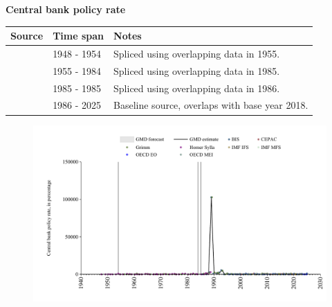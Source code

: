 \documentclass[12pt,a4paper,landscape]{article}
\begin{document}
\begin{adjustbox}{max totalsize={\paperwidth}{\paperheight},center}
\begin{minipage}[t][\textheight][t]{\textwidth}
\vspace*{0.5cm}
{}
\begin{center}
{\Large\bfseries Central bank policy rate}
\end{center}
\vspace{0.5cm}
\begin{table}[H]
\centering
\small
\begin{tabular}{|l|l|l|}
\hline
\textbf{Source} & \textbf{Time span} & \textbf{Notes} \\
\hline
\rowcolor{white}\cite{Homer_Sylla}& 1948 - 1954 &Spliced using overlapping data in 1955. \\
\rowcolor{lightgray}\cite{Grimm}& 1955 - 1984 &Spliced using overlapping data in 1985. \\
\rowcolor{white}\cite{Homer_Sylla}& 1985 - 1985 &Spliced using overlapping data in 1986. \\
\rowcolor{lightgray}\cite{BIS}& 1986 - 2025 &Baseline source, overlaps with base year 2018. \\
\hline
\end{tabular}
\end{table}
\begin{figure}[H]
\centering
\includegraphics[width=\textwidth,height=0.6\textheight,keepaspectratio]{graphs/BRA_cbrate.pdf}
\end{figure}
\end{minipage}
\end{adjustbox}
\end{document}
